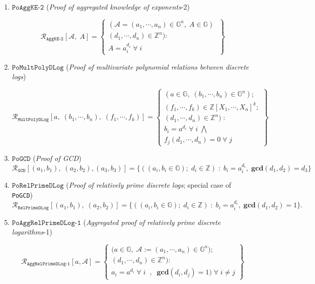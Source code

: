 \documentclass[11pt, lettersize, notitlepage, leqno, footskip=0.6cm]{article}
\newcommand{\bz}{\mathbb Z}
\newcommand{\ttt}{\texttt}
\newcommand{\mc}{\mathcal}
\newcommand{\mb}{\mathbb}
\newcommand{\mbf}{\mathbf}
\newcommand{\vs}{\vspace{-0.15cm}}
\newcommand{\GCD}{\mbf{gcd}}
\numberwithin{equation}{section}
\begin{document}
{\begin{enumerate}[wide, labelwidth=!, labelindent=0pt]
\item $\ttt{PoAggKE-2}$ (\textit{Proof of aggregated knowledge of exponents}-2) \vspace{-0.3cm}

\[
  \mc{R}_{{\ttt{AggKE-2}}}[\mc{A},\;A] = \left\{\begin{array}{l}
    (\mc{A} = (a_1,\cdots, a_n)\in \mb{G}^n,\; A\in\mb{G})\;\\ 
    (d_1,\cdots,d_n)\in\bz^n) :  \\
     A = a_i^{d_i}\;\forall\;  i
  \end{array}\right\}
\]

\item $\ttt{PoMultPolyDLog}$ (\textit{Proof of multivariate polynomial relations between discrete logs})\vspace{-0.6cm}

\[
  \mc{R}_{\ttt{MultPolyDLog}}[a,\; (b_1,\cdots, b_n),\; (f_1,\cdots,f_k)] = \left\{\begin{array}{l}
    (a\in\mb{G},\; (b_1,\cdots, b_n)\in\mb{G}^n);\\
    (f_1,\cdots,f_k)\in\bz[X_1,\cdots,X_n]^k;\\ 
    (d_1,\cdots,d_n)\in\bz^n)\;: \\
    b_i = a^{d_i}\;\forall\; i\;\bigwedge \;\\   f_j(d_1,\cdots,d_n) = 0\;\forall\; j 
  \end{array}\right\}
\]


\item $\ttt{PoGCD}$ (\textit{Proof of GCD}) \vspace{-0.15cm} $$\mc{R}_{{\ttt{GCD}}}[(a_1,b_1),\; (a_2,b_2),(a_3,b_3)] = \{((a_i, b_i\in\mb{G});\;d_i\in\bz)\;:\; b_i = a_i^{d_i},\;\GCD(d_1,d_2)=d_3  \} $$


\item $\ttt{PoRelPrimeDLog}$ (\textit{Proof of relatively prime discrete logs}; special case of \verb|PoGCD|) \vs $$ \mc{R}_{\ttt{RelPrimeDLog}}[(a_1,b_1),\;(a_2,b_2)] = \{((a_i, b_i\in\mb{G});\;d_i\in\bz)\;:\; b_i = a_i^{d_i},\;\GCD(d_1,d_2)=1 \} .$$


\item $\ttt{PoAggRelPrimeDLog-1}$ (\textit{Aggregated proof of relatively prime discrete logarithms}-1) \vspace{-0.2cm}

\[
  \mc{R}_{\ttt{AggRelPrimeDLog-1}}[a, \mc{A}] = \left\{\begin{array}{l}
    \big(a\in\mb{G},\;  \mc{A}:=(a_1,\cdots, a_n)\in\mb{G}^n);\\
    (d_1,\cdots,d_n)\in\bz^n\big): \\
    a_i = a^{d_i}\;\forall\;i\;\;,\;\; \GCD(d_i, d_j) = 1)\;\forall \;i\neq j   	
  \end{array}\right\}
\] 


\end{enumerate}}
\end{document}
